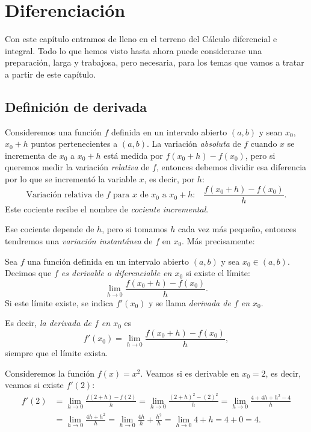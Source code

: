
\chapter{Diferenciación}

Con este capítulo entramos de lleno en el terreno del Cálculo diferencial e integral.
Todo lo que hemos visto hasta ahora puede considerarse una preparación, larga y trabajosa, pero necesaria, para los temas que vamos a tratar a partir de este capítulo.

\section{Definición de derivada}

Consideremos una función $f$ definida en un intervalo abierto $(a,b)$ y sean $x_0$, $x_0+h$ puntos pertenecientes a $(a,b)$. 
La variación \emph{absoluta} de $f$ cuando $x$ se incrementa de $x_0$ a $x_0+h$ está medida por $f(x_0+h)-f(x_0)$, pero si queremos medir la variación \emph{relativa} de $f$, entonces debemos dividir esa diferencia por lo que se incrementó la variable $x$, es decir, por $h$:
\[
\text{Variación relativa de $f$ para $x$ de $x_0$ a $x_0+h$:}
\quad\frac{f(x_0+h)-f(x_0)}h.
\]
Este cociente recibe el nombre de \emph{cociente incremental}.

Ese cociente depende de $h$, pero si tomamos $h$ cada vez más pequeño, entonces tendremos una \emph{variación instantánea} de $f$ en $x_0$. Más precisamente:

\begin{definition}
Sea $f$ una función definida en un intervalo abierto $(a,b)$ y sea $x_0\in(a,b)$. Decimos que \emph{$f$ es derivable o diferenciable en $x_0$} si existe el límite:
\[
\lim_{h\to 0} \frac{f(x_0+h)-f(x_0)}{h}.
\]
Si este límite existe, se indica $f'(x_0)$ y se llama \emph{derivada de $f$ en $x_0$}.
\end{definition}

Es decir, \emph{la derivada de $f$ en $x_0$} es 
\[
f'(x_0) = \lim_{h\to 0} \frac{f(x_0+h)-f(x_0)}{h},
\]
siempre que el límite exista.


\begin{example}
    Consideremos la función $f(x)=x^2$. Veamos si es derivable en $x_0=2$, es decir, veamos si existe $f'(2)$:
    \begin{align*}
    f'(2) 
    &= \lim_{h\to 0}\frac{f(2+h)-f(2)}{h}
    = \lim_{h\to 0}\frac{(2+h)^2-(2)^2}{h}
    = \lim_{h\to 0}\frac{4+4h+h^2-4}{h}
    \\
    &= \lim_{h\to 0}\frac{4h+h^2}{h}
    = \lim_{h\to 0}\frac{4h}h+\frac{h^2}{h}
    = \lim_{h\to 0}4+h
    = 4+0=4.
    \end{align*}
\end{example}

